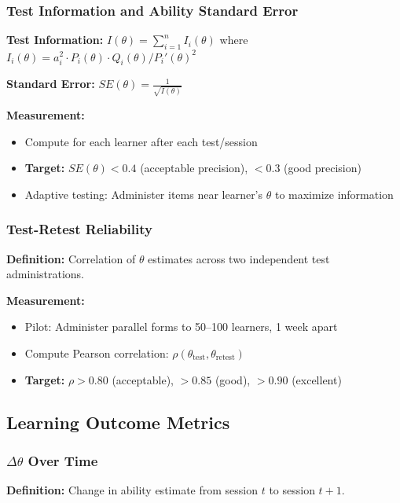 \documentclass[11pt,letterpaper]{article}
\begin{document}
\subsubsection{Test Information and Ability Standard Error}

\textbf{Test Information:} $I(\theta) = \sum_{i=1}^{n} I_i(\theta)$ where $I_i(\theta) = a_i^2 \cdot P_i(\theta) \cdot Q_i(\theta) / P_i'(\theta)^2$

\textbf{Standard Error:} $SE(\theta) = \frac{1}{\sqrt{I(\theta)}}$

\textbf{Measurement:}
\begin{itemize}
\item Compute for each learner after each test/session
\item \textbf{Target:} $SE(\theta) < 0.4$ (acceptable precision), $< 0.3$ (good precision)
\item Adaptive testing: Administer items near learner's $\theta$ to maximize information
\end{itemize}

\subsubsection{Test-Retest Reliability}

\textbf{Definition:} Correlation of $\theta$ estimates across two independent test administrations.

\textbf{Measurement:}
\begin{itemize}
\item Pilot: Administer parallel forms to 50--100 learners, 1 week apart
\item Compute Pearson correlation: $\rho(\theta_{\text{test}}, \theta_{\text{retest}})$
\item \textbf{Target:} $\rho > 0.80$ (acceptable), $> 0.85$ (good), $> 0.90$ (excellent)
\end{itemize}

\subsection{Learning Outcome Metrics}

\subsubsection{$\Delta\theta$ Over Time}

\textbf{Definition:} Change in ability estimate from session $t$ to session $t+1$.
\end{document}
